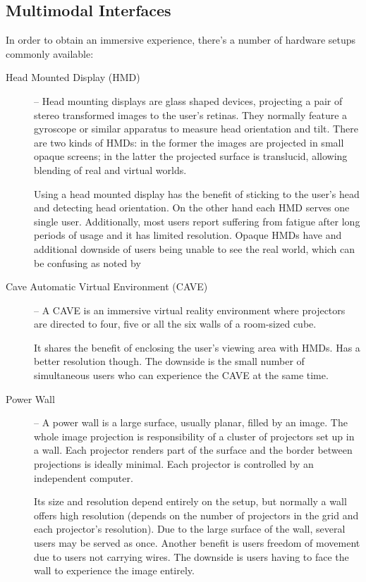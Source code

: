 
\subsection{Multimodal Interfaces}

In order to obtain an immersive experience, there's a number of hardware
setups commonly available:

\begin{description}
	\item[Head Mounted Display (HMD)] --
	  Head mounting displays are glass shaped devices, projecting a pair of stereo
	  transformed images to the user's retinas.
	  They normally feature a gyroscope or similar apparatus to measure head orientation and tilt.
	  There are two kinds of HMDs: in the former the images are projected in small opaque screens;
	  in the latter the projected surface is translucid, allowing blending of real and virtual worlds.
	  
		Using a head mounted display has the benefit of sticking to the user's head
		and detecting head orientation.
		On the other hand each HMD serves one single user.
		Additionally, most users report suffering from fatigue after long periods of
		usage \cite{VREDUC} and it has limited resolution.
		Opaque HMDs have and additional downside of users being unable to see the real world, 
		which can be confusing as noted by \cite{VANDERPOL}
			
	\item[Cave Automatic Virtual Environment (CAVE)] --
	  A CAVE is an immersive virtual reality environment where projectors are directed to four,
	  five or all the six walls of a room-sized cube.
	  
		It shares the benefit of enclosing the user's viewing area with HMDs.
		Has a better resolution though.
		The downside is the small number of simultaneous users who can experience the CAVE at the same time.
	
	\item[Power Wall] --
	  A power wall is a large surface, usually planar, filled by an image.
	  The whole image projection is responsibility of a cluster of projectors set up in a wall.
	  Each projector renders part of the surface and the border between projections is ideally minimal.
	  Each projector is controlled by an independent computer.
	  
		Its size and resolution depend entirely on the setup, but normally a wall offers high resolution
		(depends on the number of projectors in the grid and each projector's resolution).
		Due to the large surface of the wall, several users may be served as once. Another benefit
		is users freedom of movement due to users not carrying wires. \cite{INTTABLE}
		The downside is users having to face the wall to experience the image entirely.
\end{description}

